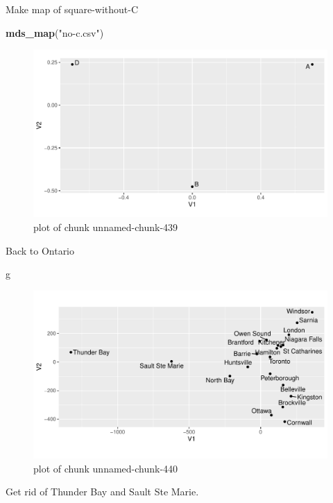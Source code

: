 \documentclass[ignorenonframetext,]{beamer}
\newenvironment{Shaded}{\begin{snugshade}}{\end{snugshade}}
\newcommand{\KeywordTok}[1]{\textcolor[rgb]{0.13,0.29,0.53}{\textbf{#1}}}
\newcommand{\NormalTok}[1]{#1}
\newcommand{\StringTok}[1]{\textcolor[rgb]{0.31,0.60,0.02}{#1}}
\begin{document}
\begin{frame}[fragile]{Make map of square-without-C}
\protect\hypertarget{make-map-of-square-without-c}{}

\begin{Shaded}
\begin{Highlighting}[]
\KeywordTok{mds_map}\NormalTok{(}\StringTok{"no-c.csv"}\NormalTok{)}
\end{Highlighting}
\end{Shaded}

\begin{figure}
\centering
\includegraphics{figure/unnamed-chunk-439-1.pdf}
\caption{plot of chunk unnamed-chunk-439}
\end{figure}

\end{frame}

\begin{frame}[fragile]{Back to Ontario}
\protect\hypertarget{back-to-ontario}{}

\begin{Shaded}
\begin{Highlighting}[]
\NormalTok{g}
\end{Highlighting}
\end{Shaded}

\begin{figure}
\centering
\includegraphics{figure/unnamed-chunk-440-1.pdf}
\caption{plot of chunk unnamed-chunk-440}
\end{figure}

Get rid of Thunder Bay and Sault Ste Marie.

\end{frame}
\end{document}
